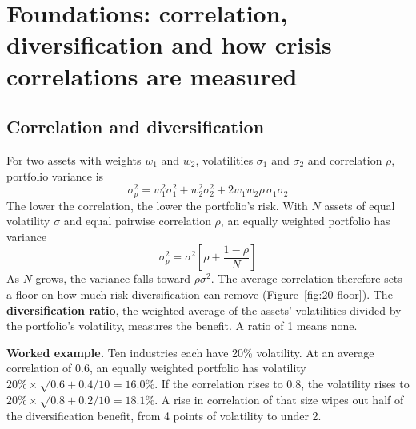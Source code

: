 \section{Foundations: correlation, diversification and how crisis correlations are measured}
\label{sec:20-foundations}

\subsection{Correlation and diversification}

For two assets with weights $w_1$ and $w_2$, volatilities $\sigma_1$ and $\sigma_2$ and correlation $\rho$, portfolio variance is
\begin{equation}
  \sigma_p^2 = w_1^2\sigma_1^2 + w_2^2\sigma_2^2 + 2w_1w_2\rho\,\sigma_1\sigma_2
  \label{eq:20-var2}
\end{equation}
The lower the correlation, the lower the portfolio's risk. With $N$ assets of equal volatility $\sigma$ and equal pairwise correlation $\rho$, an equally weighted portfolio has variance
\begin{equation}
  \sigma_p^2 = \sigma^2\left[\rho + \frac{1 - \rho}{N}\right]
  \label{eq:20-varN}
\end{equation}
As $N$ grows, the variance falls toward $\rho\sigma^2$. The average correlation therefore sets a floor on how much risk diversification can remove (Figure~\ref{fig:20-floor}). The \textbf{diversification ratio}, the weighted average of the assets' volatilities divided by the portfolio's volatility, measures the benefit. A ratio of 1 means none.

\textbf{Worked example.} Ten industries each have 20\% volatility. At an average correlation of 0.6, an equally weighted portfolio has volatility $20\% \times \sqrt{0.6 + 0.4/10} = 16.0\%$. If the correlation rises to 0.8, the volatility rises to $20\% \times \sqrt{0.8 + 0.2/10} = 18.1\%$. A rise in correlation of that size wipes out half of the diversification benefit, from 4 points of volatility to under 2.


